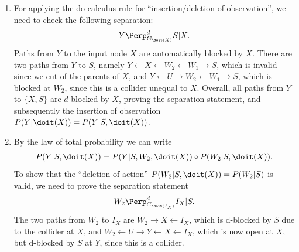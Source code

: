 \begin{enumerate}
  \begin{gradedsolution}
    \begin{enumerate}
      \item {} For applying the do-calculus rule for ``insertion/deletion of observation'', we need to check the following separation:
      \begin{equation*}
        Y \Perp_{G_{\doit(X)}}^{d} S | X.
      \end{equation*}
      Paths from $Y$ to the input node $X$ are automatically blocked by $X$.
      There are two paths from $Y$ to $S$, namely $Y \leftarrow X \leftarrow W_2 \leftarrow W_1 \rightarrow S$, which is invalid since we cut of the parents of $X$, and $Y \leftarrow U \rightarrow W_2 \leftarrow W_1 \rightarrow S$, which is blocked at $W_2$, since this is a collider unequal to $X$.
      Overall, all paths from $Y$ to $\{X, S\}$ are $d$-blocked by $X$, proving the separation-statement, and subsequently the insertion of observation $P(Y | \doit(X)) = P(Y | S, \doit(X))$.
      \item {}
      By the law of total probability we can write 
      \begin{align*}
        P(Y | S, \doit(X)) = P(Y | S, W_2, \doit(X)) \circ P(W_2 | S, \doit(X)).
      \end{align*}
      To show that the ``deletion of action'' $P(W_2 | S, \doit(X)) = P(W_2 | S)$ is valid, we need to prove the separation statement
      \begin{equation*}
        W_2 \Perp_{G_{\doit(I_X)}}^d I_X | S.
      \end{equation*}
      The two paths from $W_2$ to $I_X$ are $W_2 \rightarrow X \leftarrow I_X$, which is d-blocked by $S$ due to the collider at $X$, and $W_2 \leftarrow U \rightarrow Y \leftarrow X \leftarrow I_X$, which is now open at $X$, but d-blocked by $S$ at $Y$, since this is a collider.


\end{enumerate}
\end{gradedsolution}
\end{enumerate}
